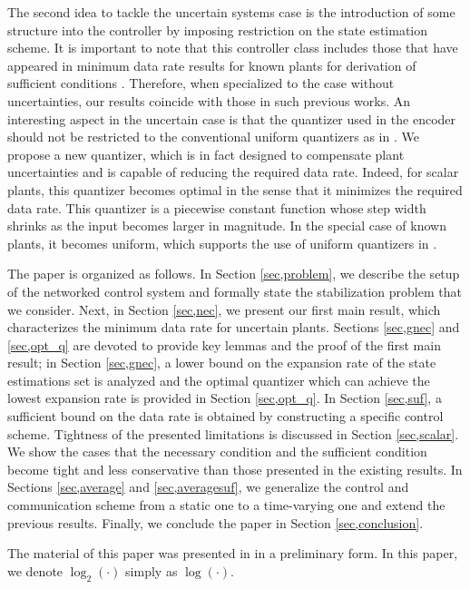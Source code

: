\documentclass[a4paper, 11pt]{article}
\theoremstyle{definition}
\begin{document}
The second idea to tackle the uncertain systems case is the introduction
of some structure into the controller by imposing restriction on the state
estimation scheme.
It is important to note that this controller class includes those that
have appeared in minimum data rate results for known plants for derivation
of sufficient conditions \cite{Tatikonda2004, Tatikonda2004a, You2010}.
Therefore, when specialized to the case without uncertainties, our results
coincide with those in such previous works. An interesting aspect in the uncertain case is that the quantizer used
in the encoder should not be restricted to the conventional uniform quantizers
as in \cite{Phat2004, Martins2006, Okano2012}.
We propose a new quantizer, which is in fact designed to compensate plant
uncertainties and is capable of reducing the required data rate.
Indeed, for scalar plants, this quantizer becomes optimal in the sense that
it minimizes the required data rate.
This quantizer is a piecewise constant function whose step width shrinks
as the input becomes larger in magnitude.
In the special case of known plants, it becomes uniform, which supports
the use of uniform quantizers in \cite{You2010}.

The paper is organized as follows.
In Section \ref{sec,problem}, we describe the setup of the networked
control system and formally state the stabilization problem that we consider.
Next, in Section \ref{sec,nec}, we present our first main result, which
characterizes the minimum data rate for uncertain plants.
Sections \ref{sec,gnec} and \ref{sec,opt_q} are devoted to provide key lemmas
and the proof of the first main result;
in Section \ref{sec,gnec}, a lower bound on the expansion rate of the
state estimations set is analyzed and the optimal quantizer which can
achieve the lowest expansion rate is provided in Section \ref{sec,opt_q}.
In Section \ref{sec,suf}, a sufficient bound on the data rate is obtained
by constructing a specific control scheme.
Tightness of the presented limitations is discussed in Section \ref{sec,scalar}.
We show the cases that the necessary condition and the sufficient condition
become tight and less conservative than those presented in the existing results.
In Sections \ref{sec,average} and \ref{sec,averagesuf}, we generalize the
control and communication scheme from a static one to a time-varying one
and extend the previous results.
Finally, we conclude the paper in Section \ref{sec,conclusion}.

The material of this paper was presented in \cite{Okano2012b} in
a preliminary form.
In this paper, we denote $\log_2(\cdot)$ simply as $\log(\cdot)$.
\end{document}
